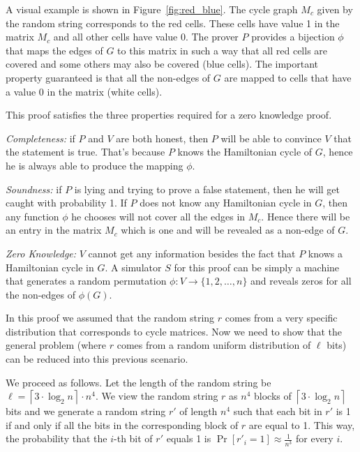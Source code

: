 A visual example is shown in Figure~\ref{fig:red_blue}. The cycle graph $M_c$ given by the
random string corresponds to the red cells. These cells have value 1 in the matrix $M_c$ and
all other cells have value 0. The prover $P$ provides a bijection $\phi$ that
maps the edges of $G$ to this matrix in such a way that all red cells are covered and
some others may also be covered (blue cells). The important property guaranteed is that
all the non-edges of $G$ are mapped to cells that have a value 0 in the matrix (white cells).

This proof satisfies the three properties required for a zero knowledge proof.

\textit{Completeness:} if $P$ and $V$ are both honest, then $P$ will be able to convince
$V$ that the statement is true. That's because $P$ knows the Hamiltonian cycle of $G$,
hence he is always able to produce the mapping $\phi$.

\textit{Soundness:} if $P$ is lying and trying to prove a false statement, then he will
get caught with probability 1. If $P$ does not know any Hamiltonian cycle in $G$, then
any function $\phi$ he chooses will not cover all the edges in $M_c$. Hence there will
be an entry in the matrix $M_c$ which is one and will be revealed as a non-edge of $G$.

\textit{Zero Knowledge:} $V$ cannot get any information besides the fact that $P$
knows a Hamiltonian cycle in $G$. A simulator $S$ for this proof can be simply a machine
that generates a random permutation $\phi:V\rightarrow \{1,2,\ldots,n\}$ and reveals zeros
for all the non-edges of $\phi(G)$.

\vspace{5mm}

In this proof we assumed that the random string $r$ comes from a very specific distribution
that corresponds to cycle matrices.
Now we need to show that the general problem (where $r$ comes from a
random uniform distribution of $\ell$ bits) can be reduced into this previous scenario.

We proceed as follows.
Let the length of the random string be
$\ell=\left\lceil 3\cdot \log_2 n\right\rceil \cdot n^4$.
We view the random string $r$ as $n^4$ blocks of $\left\lceil 3\cdot \log_2 n\right\rceil$
bits and we generate a random string $r'$ of length $n^4$ such that each bit in $r'$
is 1 if and only if all the bits in the corresponding block of $r$ are equal to 1.
This way, the probability that the $i$-th bit of $r'$ equals 1 is $\Pr[r'_i=1]\approx\frac{1}{n^3}$ for every $i$.

